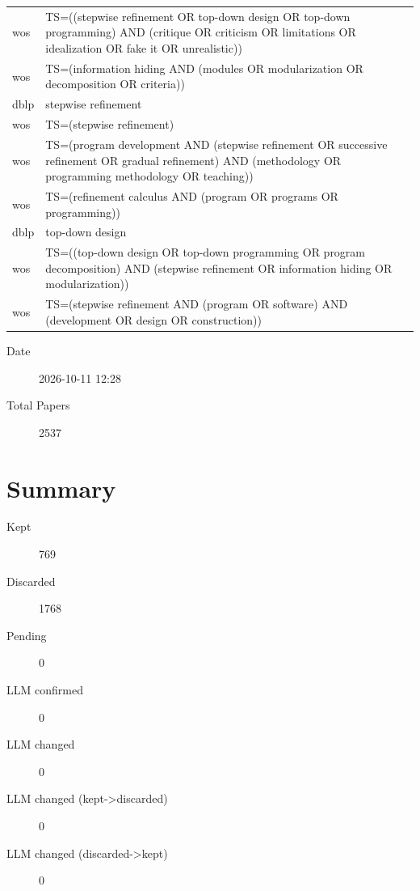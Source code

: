 \documentclass{article}
\begin{document}
\begin{longtable}{lp{10cm}}
wos & TS=((\textquotedbl{}stepwise refinement\textquotedbl{} OR \textquotedbl{}top-down design\textquotedbl{} OR \textquotedbl{}top-down programming\textquotedbl{}) AND (critique OR criticism OR limitations OR idealization OR \textquotedbl{}fake it\textquotedbl{} OR unrealistic)) \\
wos & TS=(\textquotedbl{}information hiding\textquotedbl{} AND (modules OR modularization OR decomposition OR criteria)) \\
dblp & stepwise refinement \\
wos & TS=(\textquotedbl{}stepwise refinement\textquotedbl{}) \\
wos & TS=(\textquotedbl{}program development\textquotedbl{} AND (\textquotedbl{}stepwise refinement\textquotedbl{} OR \textquotedbl{}successive refinement\textquotedbl{} OR \textquotedbl{}gradual refinement\textquotedbl{}) AND (methodology OR \textquotedbl{}programming methodology\textquotedbl{} OR teaching)) \\
wos & TS=(\textquotedbl{}refinement calculus\textquotedbl{} AND (program OR programs OR programming)) \\
dblp & top-down design \\
wos & TS=((\textquotedbl{}top-down design\textquotedbl{} OR \textquotedbl{}top-down programming\textquotedbl{} OR \textquotedbl{}program decomposition\textquotedbl{}) AND (\textquotedbl{}stepwise refinement\textquotedbl{} OR \textquotedbl{}information hiding\textquotedbl{} OR modularization)) \\
wos & TS=(\textquotedbl{}stepwise refinement\textquotedbl{} AND (program OR software) AND (development OR design OR construction)) \\
\bottomrule
\end{longtable}

\begin{description}
\item[Date] 2026-10-11 12:28
\item[Total Papers] 2537
\end{description}

\section{Summary}
\begin{description}
\item[Kept] 769
\item[Discarded] 1768
\item[Pending] 0
\item[LLM confirmed] 0
\item[LLM changed] 0
\item[LLM changed (kept->discarded)] 0
\item[LLM changed (discarded->kept)] 0
\end{description}
\end{document}
